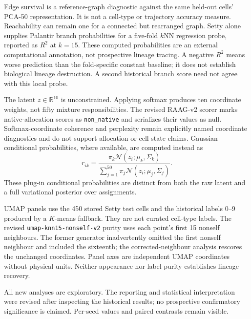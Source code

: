 \documentclass[11pt]{article}
\begin{document}
Edge survival is a reference-graph diagnostic against the same held-out
cells' PCA-50 representation. It is not a cell-type or trajectory accuracy
measure. Reachability can remain one for a connected but rearranged graph.
Setty alone supplies Palantir branch probabilities for a five-fold $k$NN
regression probe, reported as $R^2$ at $k=15$\cite{setty2019palantir}.
These computed probabilities are an external computational annotation,
not prospective lineage tracing. A negative $R^2$ means worse prediction
than the fold-specific constant baseline; it does not establish biological
lineage destruction. A second historical branch score need not agree with
this local probe.

The latent $z\in\mathbb R^{10}$ is unconstrained. Applying softmax produces
ten coordinate weights, not fifty mixture responsibilities. The revised
RAAG-v2 scorer marks native-allocation scores as \texttt{non\_native} and
serializes their values as null. Softmax-coordinate coherence and perplexity
remain explicitly named coordinate diagnostics and do not support allocation
or cell-state claims. Gaussian conditional probabilities, where available,
are computed instead as
\begin{equation}
 r_{ik}=\frac{\pi_k\mathcal N(z_i;\mu_k,\Sigma_k)}
 {\sum_{j=1}^{50}\pi_j\mathcal N(z_i;\mu_j,\Sigma_j)}.
\label{eq:responsibility}
\end{equation}
These plug-in conditional probabilities are distinct from both the raw latent
and a full variational posterior over assignments.

UMAP panels use the 450 stored Setty test cells and the historical labels
0--9 produced by a $K$-means fallback. They are not curated cell-type labels.
The revised \texttt{umap-knn15-nonself-v2} purity uses each point's first 15
nonself neighbours. The former generator inadvertently omitted the first
nonself neighbour and included the sixteenth; the corrected-neighbour analysis rescores the unchanged
coordinates. Panel axes are independent UMAP coordinates without physical
units\cite{mcinnes2018umap}. Neither appearance nor label purity establishes
lineage recovery.

All new analyses are exploratory. The reporting and statistical interpretation were revised after inspecting the historical results; no prospective confirmatory significance is claimed. Per-seed values and paired contrasts remain visible.
\end{document}
